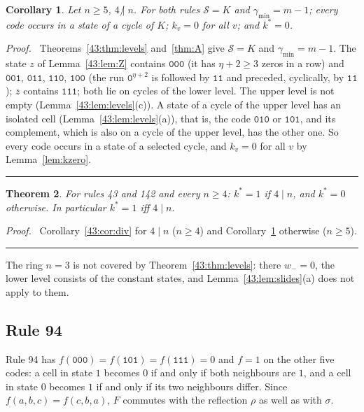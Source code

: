 \documentclass[10pt,a4paper]{article}
\newtheorem{theorem}{Theorem}[section]
\newtheorem{corollary}[theorem]{Corollary}
{\theorembodyfont{\upshape}
\newtheorem{remark}[theorem]{Remark}
\newtheorem{definition}[theorem]{Definition}}
\newcommand{\qedmark}{\rule{1.1ex}{1.1ex}}
\newenvironment{proof}[1][Proof]{\par\smallskip\noindent\textit{#1.}\ }{\hfill\qedmark\par\smallskip}
\newcommand{\cpl}[1]{\overline{#1}}           %
\newcommand{\gmin}{\gamma_{\min}}
\newcommand{\Sel}{\mathcal{S}}                %
\newcommand{\kst}{k^{*}}
\newcommand{\code}[1]{\mathtt{#1}}            %
\newcommand{\ndiv}{\mathrel{\not|}}           %
\begin{document}
\begin{corollary}\label{43:cor:ndiv}
Let $n\ge 5$, $4\ndiv n$. For both rules $\Sel=K$ and $\gmin=m-1$; every code occurs in a state of a cycle of
$K$; $k_v=0$ for all $v$; and $\kst=0$.
\end{corollary}
\begin{proof}
Theorems~\ref{43:thm:levels} and~\ref{thm:A} give $\Sel=K$ and $\gmin=m-1$. The state $z$ of
Lemma~\ref{43:lem:Z} contains $\code{000}$ (it has $\eta+2\ge 3$ zeros in a row) and $\code{001}$,
$\code{011}$, $\code{110}$, $\code{100}$ (the run $\code{0}^{\eta+2}$ is followed by $\code{11}$ and preceded,
cyclically, by $\code{11}$); $\cpl{z}$ contains $\code{111}$; both lie on cycles of the lower level. The upper level is not empty (Lemma~\ref{43:lem:levels}(c)). A state of a cycle of the upper level has an
isolated cell (Lemma~\ref{43:lem:levels}(a)), that is, the code $\code{010}$ or $\code{101}$, and its
complement, which is also on a cycle of the upper level, has the other one. So every code occurs in a state of a
selected cycle, and $k_v=0$ for all $v$ by Lemma~\ref{lem:kzero}.
\end{proof}

\begin{theorem}\label{43:thm:main}
For rules 43 and 142 and every $n\ge 4$: $\kst=1$ if $4\mid n$, and $\kst=0$ otherwise. In particular
$\kst=1$ iff $4\mid n$.
\end{theorem}
\begin{proof}
Corollary~\ref{43:cor:div} for $4\mid n$ ($n\ge 4$) and Corollary~\ref{43:cor:ndiv} otherwise ($n\ge 5$).
\end{proof}

The ring $n=3$ is not covered by Theorem~\ref{43:thm:levels}: there $w_-=0$, the lower level consists of the
constant states, and Lemma~\ref{43:lem:slides}(a) does not apply to them.

\subsection{Rule 94}\label{sec:94}

Rule 94 has $f(\code{000})=f(\code{101})=f(\code{111})=0$ and $f=1$ on the other five codes: a cell in state $1$
becomes $0$ if and only if both neighbours are $1$, and a cell in state $0$ becomes $1$ if and only if its two
neighbours differ. Since $f(a,b,c)=f(c,b,a)$, $F$ commutes with the reflection $\rho$ as well as with $\sigma$.
\end{document}
